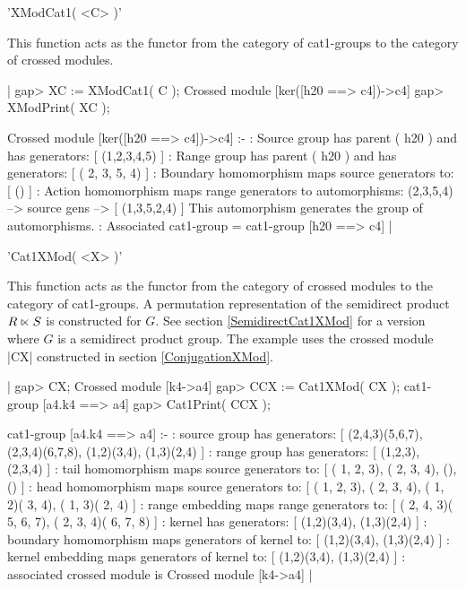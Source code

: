 %

'XModCat1( <C> )'

This function acts as the functor  from the category of cat1-groups to
the category of crossed modules.

|    gap> XC := XModCat1( C );
    Crossed module [ker([h20 ==> c4])->c4]
    gap> XModPrint( XC );

    Crossed module [ker([h20 ==> c4])->c4] :- 
    : Source group has parent ( h20 ) and has generators:
      [ (1,2,3,4,5) ]
    : Range group has parent ( h20 ) and has generators:
      [ ( 2, 3, 5, 4) ]
    : Boundary homomorphism maps source generators to:
      [ () ]
    : Action homomorphism maps range generators to automorphisms:
      (2,3,5,4) --> { source gens --> [ (1,3,5,2,4) ] }
      This automorphism generates the group of automorphisms.
    : Associated cat1-group = cat1-group [h20 ==> c4]  |

%

'Cat1XMod( <X> )'

This function acts as the functor from the category of crossed modules
to the category of  cat1-groups.  A permutation representation of  the
semidirect product $R   \semidirect S$ is constructed  for  $G$.   See
section \ref{SemidirectCat1XMod}  for   a  version  where  $G$ is    a
semidirect product group.  The   example uses the crossed module  |CX|
constructed in section
\ref{ConjugationXMod}.

|    gap> CX;
    Crossed module [k4->a4]
    gap> CCX := Cat1XMod( CX );
    cat1-group [a4.k4 ==> a4] 
    gap> Cat1Print( CCX );

    cat1-group [a4.k4 ==> a4] :- 
    : source group has generators:
      [ (2,4,3)(5,6,7), (2,3,4)(6,7,8), (1,2)(3,4), (1,3)(2,4) ]
    :  range group has generators:
      [ (1,2,3), (2,3,4) ]
    : tail homomorphism maps source generators to:
      [ ( 1, 2, 3), ( 2, 3, 4), (), () ]
    : head homomorphism maps source generators to:
      [ ( 1, 2, 3), ( 2, 3, 4), ( 1, 2)( 3, 4), ( 1, 3)( 2, 4) ]
    : range embedding maps range generators to:
      [ ( 2, 4, 3)( 5, 6, 7), ( 2, 3, 4)( 6, 7, 8) ]
    : kernel has generators:
      [ (1,2)(3,4), (1,3)(2,4) ]
    : boundary homomorphism maps generators of kernel to:
      [ (1,2)(3,4), (1,3)(2,4) ]
    : kernel embedding maps generators of kernel to:
      [ (1,2)(3,4), (1,3)(2,4) ]
    : associated crossed module is Crossed module [k4->a4]    |


